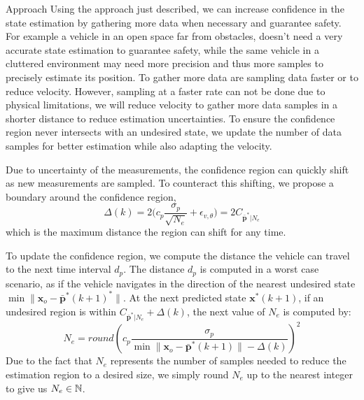 \begin{section}{Approach}
Using the approach just  described, we can increase confidence in the state estimation by gathering more data when necessary and guarantee safety. For example a vehicle in an open space far from obstacles, doesn't need a very accurate state estimation to guarantee safety, while the same vehicle in a cluttered environment may need more precision and thus more samples to precisely estimate its position.
 To gather more data are sampling data faster or to reduce velocity. However, sampling at a faster rate can not be done due to physical limitations, we will reduce velocity to gather more data samples in a shorter distance to reduce estimation uncertainties. To ensure the confidence region never intersects with an undesired state, we update the number of data samples for better estimation while also adapting the velocity.

Due to uncertainty of the measurements, the confidence region can quickly shift as new measurements are sampled. To counteract this shifting, we propose a boundary around the confidence region,
    \begin{equation}
    \label{eq:Delta}
	    \Delta(k) = 2\big(c_p\frac{\sigma_p}{\sqrt{N_e}} + \epsilon_{v,\theta}\big) = 2C_{\bar{\bm{p}}^*|N_e}
	\end{equation}
which is the maximum distance the region can shift for any time.

To update the confidence region, we compute the distance the vehicle can travel to the next time interval $d_p$. The distance $d_p$ is computed in a worst case scenario, as if the vehicle navigates in the direction of the nearest undesired state $\min \lVert \bm{x}_o - \bar{\bm{p}}^*(k+1)^* \rVert$. At the next predicted state $\bm{x}^*(k+1)$, if an undesired region is within $C_{\bar{\bm{p}}^*|N_e} + \Delta(k)$, the next value of $N_e$ is computed by:
    \begin{equation}
    \label{eq:N_e}
	    N_e = round \left(c_p \frac{ \sigma_p }{ {\min \lVert \bm{x}_o - \bar{\bm{p}}^*(k+1) \rVert} -\Delta(k) } \right)^2
	\end{equation}
Due to the fact that $N_e$ represents the number of samples needed to reduce the estimation region to a desired size, we simply round $N_e$ up to the nearest integer to give us $N_e \in \mathbb{N}$.


\end{section}
